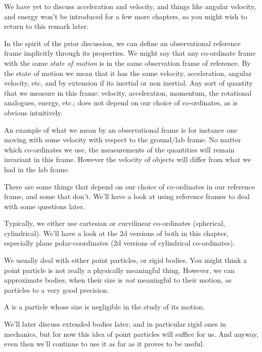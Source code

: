 \begin{remark}
    We have yet to discuss acceleration and velocity, and things like angular velocity, and energy won't be introduced for a 
    few more chapters, so you might wish to return to this remark later.

    In the spirit of the prior discussion, we can define an observational reference frame 
    implicitly through its properties. We might say that any co-ordinate frame with the same \emph{state of motion} is in the same observation 
    frame of reference. By the state of motion we mean that it has the same velocity, acceleration, angular velocity,
    etc, and by extension if its inertial or non inertial. Any sort of quantity that we measure in this frame: velocity,
    acceleration, momentum, the rotational analogues, energy, etc.;
    does not depend on our choice of co-ordinates, as is obvious intuitively.

    An example of what we mean by an observational frame is for instance one moving 
    with some velocity with respect to the ground/lab frame. No matter which co-ordinates we use, the measurements of the 
    quantities will remain invariant in this frame. However the velocity of objects will differ from what we had in 
    the lab frame.
\end{remark}

There are some things that depend on our choice of co-ordinates in our reference frame, and some that
don't. We'll have a look at using reference frames to deal with some questions
later. 

Typically, we either use cartesian or curvilinear co-ordinates (spherical, cylindrical). 
We'll have a look at the 2d versions of both in this chapter, especially plane polar-coordinates 
(2d versions of cylindrical co-ordinates).

We usually deal with either point particles, or rigid bodies.  You might think a point 
particle is not really a physically meaningful thing. However, we can
approximate bodies, when their size is \emph{not} meaningful to their
motion, as particles to a very good precision. 

\begin{definition}
    A  is a particle whose size is negligible in the study of its motion.
\end{definition}

We'll later discuss extended bodies later, and in particular rigid ones in mechanics, but for now this idea 
of point particles will suffice for us. And anyway, even then we'll continue to use it as far as it proves to be 
useful.

